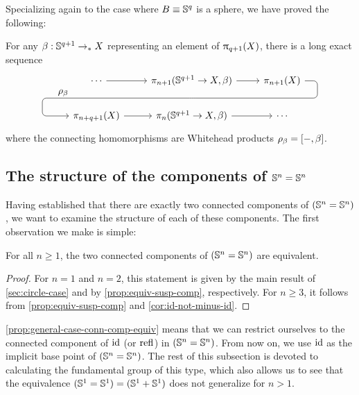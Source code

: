 \documentclass[english,a4paper]{lmcs}
\begin{document}
Specializing again to the case where $B \equiv {\mathbb S^{q}}$ is a sphere,
we have proved the following:
\begin{thm}\label{thm:sort-of-ehp}
  For any $\beta : {\mathbb S^{q+1}} \to_\ast X$ representing an element of $\uppi_{q+1}(X)$,
  there is a long exact sequence
  \[
    \begin{tikzcd}
      \cdots \ar[r]\ar[d,phantom, "\rho_\beta"{xshift=-8ex,yshift=1ex}] &
      \pi_{n+1}(\Sn{q+1} \to X, \beta)
      \ar[r] \ar[d, phantom, ""{coordinate, name=Z}] &
      \pi_{n+1}(X) \ar[dll, rounded corners,
      to path={ -- ([xshift=8.5ex]\tikztostart.center)
        |- (Z) [near end]\tikztonodes
        -| ([xshift=-13ex]\tikztotarget.center) -- (\tikztotarget)}] \\
      \pi_{n+q+1}(X) \ar[r] &
      \pi_n(\Sn{q+1} \to X,\beta) \ar[r] &
      \cdots
    \end{tikzcd}
  \]
  where the connecting homomorphisms are Whitehead products
  $\rho_\beta = [\mathord{{-}},\beta]$.
\end{thm}

\subsection{The structure of the components of
  \texorpdfstring{${\mathbb S^{n}} = {\mathbb S^{n}}$}{Sn = Sn}}

Having established that there are exactly two connected components of $({\mathbb S^{n}} = {\mathbb S^{n}})$, we want to examine the structure of each of these components.
The first observation we make is simple:

\begin{prop} \label{prop:general-case-conn-comp-equiv}
    For all $n \geq 1$, the two connected components of $({\mathbb S^{n}} = {\mathbb S^{n}})$ are equivalent.
\end{prop}
\begin{proof}
    For $n=1$ and $n=2$, this statement is given by the main result of \cref{sec:circle-case} and by \cref{prop:equiv-susp-comp}, respectively.
	For $n \geq 3$, it follows from \cref{prop:equiv-susp-comp} and \cref{cor:id-not-minus-id}.
\end{proof}

\cref{prop:general-case-conn-comp-equiv} means that we can restrict ourselves to the connected component of $\mathord{\mathrm{id}}$ (or $\mathop{{\mathrm{refl}}_{}}$) in $({\mathbb S^{n}} = {\mathbb S^{n}})$. From now on, we use $\mathord{\mathrm{id}}$ as the implicit base point of $({\mathbb S^{n}} = {\mathbb S^{n}})$.
The rest of this subsection is devoted to calculating the fundamental group of this type, which also allows us to see that the equivalence $({\mathbb S^{1}} = {\mathbb S^{1}}) = ({\mathbb S^{1}} + {\mathbb S^{1}})$ does not generalize for $n > 1$.
\end{document}
